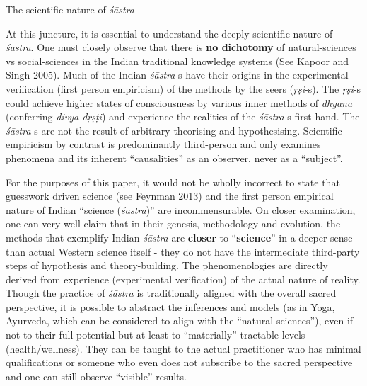 The scientific nature of {\sl śāstra}

At this juncture, it is essential to understand the deeply scientific nature of {\sl śāstra}. One must closely observe that there is {\bf no dichotomy} of natural-sciences vs social-sciences in the Indian traditional knowledge systems (See Kapoor and Singh 2005). Much of the Indian {\sl śāstra}-s have their origins in the experimental verification (first person empiricism) of the methods by the seers ({\sl ṛṣi}-s). The {\sl ṛṣi}-s could achieve higher states of consciousness by various inner methods of {\sl dhyāna} (conferring {\sl divya-dṛṣṭi}) and experience the realities of the {\sl śāstra}-s first-hand. The {\sl śāstra}-s are not the result of arbitrary theorising and hypothesising. Scientific empiricism by contrast is predominantly third-person and only examines phenomena and its inherent ``causalities'' as an observer, never as a ``subject''.

For the purposes of this paper, it would not be wholly incorrect to state that guesswork driven science (see Feynman 2013) and the first person empirical nature of Indian ``science ({\sl śāstra})'' are incommensurable. On closer examination, one can very well claim that in their genesis, methodology and  evolution, the methods that exemplify  Indian  {\sl śāstra} are {\bf closer} to ``{\bf science}'' in a deeper sense than actual Western science itself - they do not have the intermediate third-party steps of hypothesis and theory-building. The phenomenologies are directly derived from experience (experimental verification) of the actual nature of reality. Though the practice of {\sl śāstra} is traditionally aligned with the overall sacred perspective, it is possible to abstract the inferences and models (as in Yoga, Āyurveda, which can be considered to align with the ``natural sciences''), even if not to their full potential but at least to ``materially'' tractable levels (health/wellness). They can be taught to the actual practitioner who has minimal qualifications or someone who even does not subscribe to the sacred perspective and one can still observe ``visible'' results.

